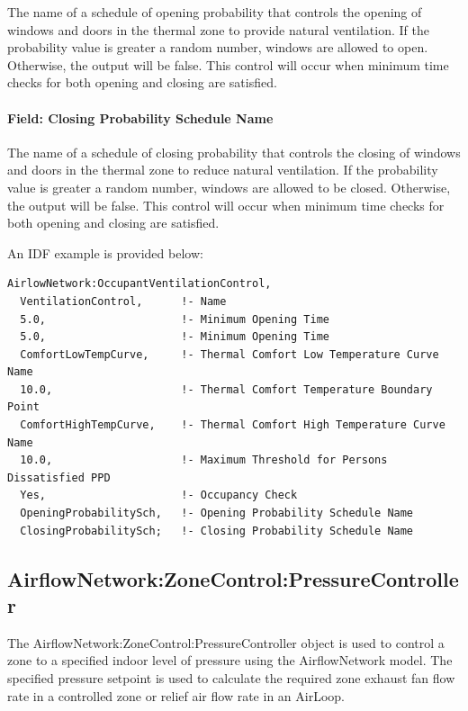 The name of a schedule of opening probability that controls the opening of windows and doors in the thermal zone to provide natural ventilation. If the probability value is greater a random number, windows are allowed to open. Otherwise, the output will be false. This control will occur when minimum time checks for both opening and closing are satisfied.

\paragraph{Field: Closing Probability Schedule Name}\label{field-closing-probability-schedule-name}

The name of a schedule of closing probability that controls the closing of windows and doors in the thermal zone to reduce natural ventilation. If the probability value is greater a random number, windows are allowed to be closed. Otherwise, the output will be false. This control will occur when minimum time checks for both opening and closing are satisfied.

An IDF example is provided below:

\begin{lstlisting}
AirlowNetwork:OccupantVentilationControl,
  VentilationControl,      !- Name
  5.0,                     !- Minimum Opening Time
  5.0,                     !- Minimum Opening Time
  ComfortLowTempCurve,     !- Thermal Comfort Low Temperature Curve Name
  10.0,                    !- Thermal Comfort Temperature Boundary Point
  ComfortHighTempCurve,    !- Thermal Comfort High Temperature Curve Name
  10.0,                    !- Maximum Threshold for Persons Dissatisfied PPD
  Yes,                     !- Occupancy Check
  OpeningProbabilitySch,   !- Opening Probability Schedule Name
  ClosingProbabilitySch;   !- Closing Probability Schedule Name
\end{lstlisting}

\subsection{AirflowNetwork:ZoneControl:PressureController}\label{airflowNetworkzonecontrolpressureoontroller}

The AirflowNetwork:ZoneControl:PressureController object is used to control a zone to a specified indoor level of pressure using the AirflowNetwork model. The specified pressure setpoint is used to calculate the required zone exhaust fan flow rate in a controlled zone or relief air flow rate in an AirLoop.

